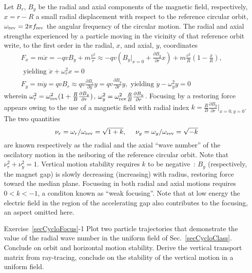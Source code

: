 Let $B_r$, $B_y$  be the radial and axial components of the magnetic field, respectively, 
$x=r-R$ a small radial displacement with respect to the reference circular orbit,  
$\omega_{\rm rev} = 2\pi f_{\rm rev} $ the angular frequency of the circular motion. 
The radial and axial  strengths experienced by a particle moving in the vicinity of that reference orbit 
write, to the first order in the radial, $x$,  and axial, $y$, coordinates 
\begin{eqnarray}
\label{EqCycloFoc}
F_x = m \ddot x=  -qvB_y + m\frac{v^2}{r} \approx -q v (B_y|_{x=0} + \frac{\partial B_y}{\partial r}x)  + m\frac{v^2}{R}(1-\frac{x}{R}), & \nonumber \\ 
\textrm{~yielding~}  \ddot x + \omega_r^2 x=0 &  \nonumber \\
F_y= m\ddot y =   qvB_r \approx q v \frac{\partial B_r}{\partial y} y = q v \frac{\partial B_y}{\partial r} y, 
 \textrm{~yielding~}    \ddot{y} - \omega_y^2 y= 0  & ~ ~ ~ 
\end{eqnarray}
wherein 
$\omega_r^2 = \omega_{\rm rev}^2(1+\frac{R}{B}\frac{\partial B_y}{\partial r})$,  
$ \omega_y^2 = \omega_{\rm rev}^2 \frac{R}{B} \frac{\partial B_y}{\partial r}$. 
Focusing by a restoring force appears owing to the use of a magnetic field with radial 
index $k = \frac{R}{B}\frac{\partial B_y}{\partial r}|_{x=0,y=0}$. 
The two quantities 
\begin{equation}
  \nu_r = \omega_r/\omega_{\rm rev} = \sqrt{1+k},   ~ ~ ~ ~ 
 \nu_y=\omega_y /\omega_{\rm rev}  = \sqrt{-k} 
\end{equation}
are known  respectively as the radial and the axial ``wave number'' of 
the oscilatory motion in the neiboring of the reference circular orbit.
Note that $\nu_r^2 + \nu_y^2=1$.
Vertical motion stability requires $k$ to be negative~:  $B_y$ (respectively, the magnet gap) 
is slowly  decreasing (increasing) with radius, restoring force toward the 
median plane. 
Focussing in both radial and axial motions requires $0 < k <-1$, a conditon known as ``weak focusing''.
 Note that  at low energy  the electric field in the 
region of the accelerating gap also contributes to the focusing, an aspect omitted here. 


\smallskip
\noindent {\small $\bullet$} Exercise~\ref{secCycloFocus}-1
Plot two particle trajectories that demonstrate the value of the radial wave number in the uniform 
field of Sec.~\ref{secCycloClass}. Conclude on orbit and horizontal motion  stability. 
Derive the  vertical  transport matrix from ray-tracing, conclude on the stability of the vertical motion
in a uniform field.


